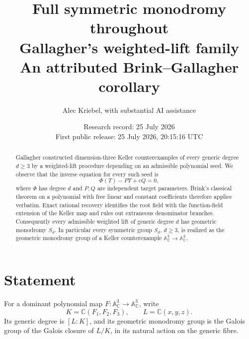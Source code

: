 \documentclass[11pt]{article}
\title{\bfseries Full symmetric monodromy throughout\\
Gallagher's weighted-lift family\\[3pt]
\large An attributed Brink--Gallagher corollary}
\author{Alec Kriebel, with substantial AI assistance}
\date{Research record: 25 July 2026\\
First public release: 25 July 2026, 20:15:16 UTC}
\theoremstyle{remark}
\newcommand{\A}{\mathbb A}
\newcommand{\C}{\mathbb C}
\begin{document}
\maketitle

\begin{center}
\end{center}

\begin{abstract}
Gallagher constructed dimension-three Keller counterexamples of every
generic degree $d\geq3$ by a weighted-lift procedure depending on an
admissible polynomial seed.  We observe that the inverse equation for every
such seed is
\[
 \Phi(T)-PT+cQ=0,
\]
where $\Phi$ has degree $d$ and $P,Q$ are independent target parameters.
Brink's classical theorem on a polynomial with free linear and constant
coefficients therefore applies verbatim.  Exact rational recovery identifies
the root field with the function-field extension of the Keller map and rules
out extraneous denominator branches.  Consequently every admissible
weighted lift of generic degree $d$ has geometric monodromy $S_d$.
In particular every symmetric group $S_d$, $d\geq3$, is realized as the
geometric monodromy group of a Keller counterexample
$\A^3_\C\to\A^3_\C$.
\end{abstract}

\section{Statement}

For a dominant polynomial map
$F:\A^3_\C\to\A^3_\C$, write
\[
 K=\C(F_1,F_2,F_3),\qquad L=\C(x,y,z).
\]
Its generic degree is $[L:K]$, and its geometric monodromy group is the
Galois group of the Galois closure of $L/K$, in its natural action on the
generic fibre.
\end{document}
